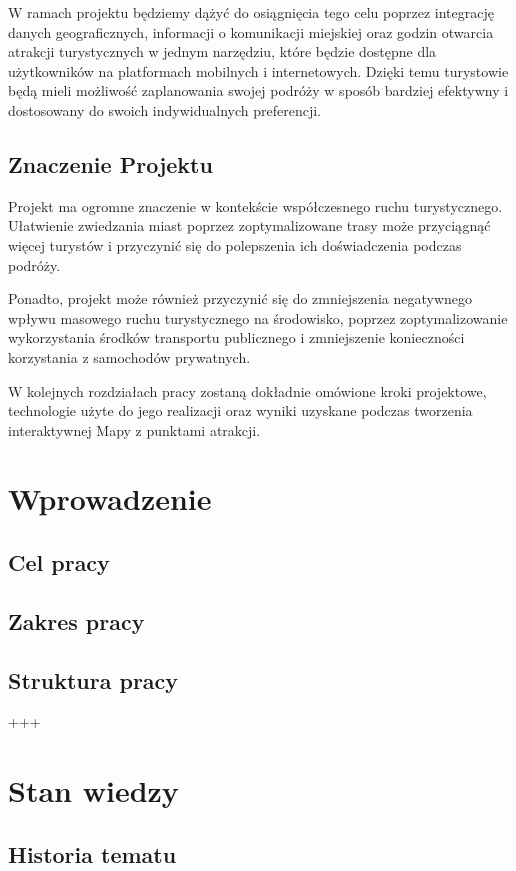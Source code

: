 \documentclass{report}
\begin{document}
	W ramach projektu będziemy dążyć do osiągnięcia tego celu poprzez integrację danych geograficznych, informacji o komunikacji miejskiej oraz godzin otwarcia atrakcji turystycznych w jednym narzędziu, które będzie dostępne dla użytkowników na platformach mobilnych i internetowych. Dzięki temu turystowie będą mieli możliwość zaplanowania swojej podróży w sposób bardziej efektywny i dostosowany do swoich indywidualnych preferencji.
	
	\section{Znaczenie Projektu}
	
	Projekt ma ogromne znaczenie w kontekście współczesnego ruchu turystycznego. Ułatwienie zwiedzania miast poprzez zoptymalizowane trasy może przyciągnąć więcej turystów i przyczynić się do polepszenia ich doświadczenia podczas podróży. 
	
	Ponadto, projekt może również przyczynić się do zmniejszenia negatywnego wpływu masowego ruchu turystycznego na środowisko, poprzez zoptymalizowanie wykorzystania środków transportu publicznego i zmniejszenie konieczności korzystania z samochodów prywatnych.
	
	W kolejnych rozdziałach pracy zostaną dokładnie omówione kroki projektowe, technologie użyte do jego realizacji oraz wyniki uzyskane podczas tworzenia interaktywnej Mapy z punktami atrakcji.
	
	\chapter{Wprowadzenie}
	\section{Cel pracy}
	\section{Zakres pracy}
	\section{Struktura pracy}
	+++
	\chapter{Stan wiedzy}
	\section{Historia tematu}
\end{document}
